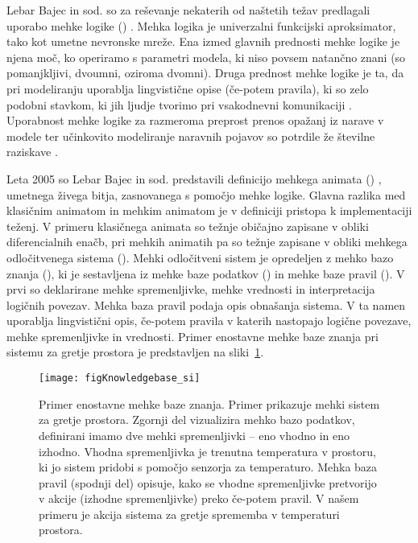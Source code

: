 \begin{razsirjeniPovzetek}
Lebar Bajec in sod. \cite{lebarbajec2005fuzzy,lebarbajec2005simulating} so za reševanje nekaterih od naštetih težav predlagali uporabo mehke logike () \cite{zadeh1965fuzzy}. Mehka logika je univerzalni funkcijski aproksimator, tako kot umetne nevronske mreže. Ena izmed glavnih prednosti mehke logike je njena moč, ko operiramo s parametri modela, ki niso povsem natančno znani (so pomanjkljivi, dvoumni, oziroma dvomni). Druga prednost mehke logike je ta, da pri modeliranju uporablja lingvistične opise (če-potem pravila), ki so zelo podobni stavkom, ki jih ljudje tvorimo pri vsakodnevni komunikaciji \cite{kosko1994fuzzy,lebarbajec2005fuzzy,lebarbajec2005simulating,mamdani1975experiment,mendel2001uncertain,zadeh1965fuzzy}. Uporabnost mehke logike za razmeroma preprost prenos opažanj iz narave v modele ter učinkovito modeliranje naravnih pojavov so potrdile že številne raziskave \cite{dasilva2008predator,demsar2013family,demsar2014simulated,demsar2016balanced,demsar2017evolution,lebarbajec2005fuzzy,lebarbajec2005simulating,tron2004mathematical}.

Leta 2005 so Lebar Bajec in sod. predstavili definicijo mehkega animata () \cite{lebarbajec2005fuzzy,lebarbajec2005simulating}, umetnega živega bitja, zasnovanega s pomočjo mehke logike. Glavna razlika med klasičnim animatom in mehkim animatom je v definiciji pristopa k implementaciji teženj. V primeru klasičnega animata so težnje običajno zapisane v obliki diferencialnih enačb, pri mehkih animatih pa so težnje zapisane v obliki mehkega odločitvenega sistema (). Mehki odločitveni sistem je opredeljen z mehko bazo znanja (), ki je sestavljena iz mehke baze podatkov () in mehke baze pravil (). V prvi so deklarirane mehke spremenljivke, mehke vrednosti in interpretacija logičnih povezav. Mehka baza pravil podaja opis obnašanja sistema. V ta namen uporablja lingvistični opis, če-potem pravila v katerih nastopajo logične povezave, mehke spremenljivke in vrednosti. Primer enostavne mehke baze znanja pri sistemu za gretje prostora je predstavljen na sliki~\ref{fig:knowledgebase_si}.

\begin{figure}
  \texttt{[image: figKnowledgebase\_si]}
  \caption{Primer enostavne mehke baze znanja. Primer prikazuje mehki sistem za gretje prostora. Zgornji del vizualizira mehko bazo podatkov, definirani imamo dve mehki spremenljivki -- eno vhodno in eno izhodno. Vhodna spremenljivka je trenutna temperatura v prostoru, ki jo sistem pridobi s pomočjo senzorja za temperaturo. Mehka baza pravil (spodnji del) opisuje, kako se vhodne spremenljivke pretvorijo v akcije (izhodne spremenljivke) preko če-potem pravil. V našem primeru je akcija sistema za gretje sprememba v temperaturi prostora.}
  \label{fig:knowledgebase_si}
\end{figure}


\end{razsirjeniPovzetek}
